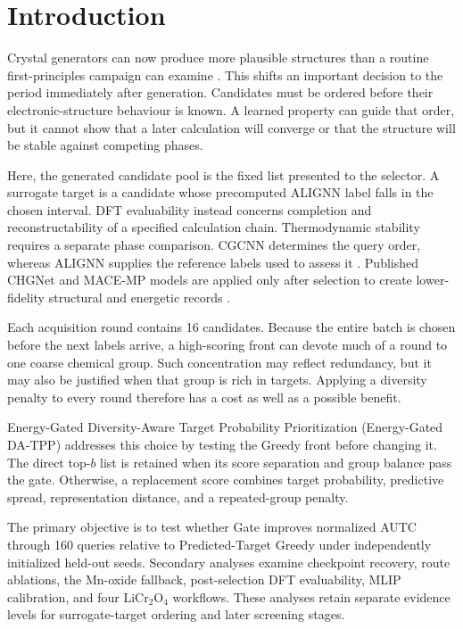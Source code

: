 \section{Introduction}

Crystal generators can now produce more plausible structures than a routine
first-principles campaign can examine
\cite{ref-cdvae,ref-diffcsp,ref-mattergen,ref-chemeleon}. This shifts an
important decision to the period immediately after generation. Candidates must
be ordered before their electronic-structure behaviour is known. A learned
property can guide that order, but it cannot show that a later calculation will
converge or that the structure will be stable against competing phases.

Here, the generated candidate pool is the fixed list presented to the selector. A
surrogate target is a candidate whose precomputed ALIGNN label falls in the chosen
interval. DFT evaluability instead concerns completion and reconstructability
of a specified calculation chain. Thermodynamic stability requires a separate
phase comparison. CGCNN determines the query order, whereas ALIGNN supplies the
reference labels used to assess it \cite{ref-cgcnn,ref-alignn}. Published CHGNet
and MACE-MP models are applied only after selection to create lower-fidelity
structural and energetic records \cite{ref-chgnet,ref-macemp}.

Each acquisition round contains 16 candidates. Because the entire batch
is chosen before the next labels arrive, a high-scoring front can devote much
of a round to one coarse chemical group. Such concentration may reflect
redundancy, but it may also be justified when that group is rich in targets.
Applying a diversity penalty to every round therefore has a cost as well as a
possible benefit.

Energy-Gated Diversity-Aware Target Probability Prioritization (Energy-Gated
DA-TPP) addresses this choice by testing the Greedy front before changing it.
The direct top-$b$ list is retained when its score separation and group balance
pass the gate. Otherwise, a replacement score combines target probability,
predictive spread, representation distance, and a repeated-group penalty.

The primary objective is to test whether Gate improves normalized AUTC through
160 queries relative to Predicted-Target Greedy under independently initialized
held-out seeds. Secondary analyses examine checkpoint recovery, route ablations,
the Mn-oxide fallback, post-selection DFT evaluability, MLIP calibration, and four
LiCr$_2$O$_4$ workflows. These analyses retain separate evidence levels for
surrogate-target ordering and later screening stages.

